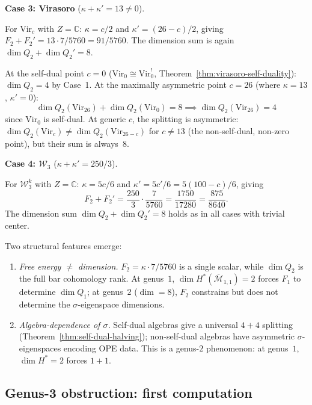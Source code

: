 \begin{computation}
\smallskip
\noindent\textbf{Case 3: Virasoro} ($\kappa + \kappa' = 13 \neq 0$).

For $\mathrm{Vir}_c$ with $Z = \mathbb{C}$:
$\kappa = c/2$ and $\kappa' = (26-c)/2$, giving
$F_2 + F_2' = 13 \cdot 7/5760 = 91/5760$.
The dimension sum is again $\dim Q_2 + \dim Q_2' = 8$.

At the self-dual point $c = 0$ ($\mathrm{Vir}_0 \cong
\mathrm{Vir}_0^!$, Theorem~\ref{thm:virasoro-self-duality}):
$\dim Q_2 = 4$ by Case~1.  At the maximally asymmetric point
$c = 26$ (where $\kappa = 13$, $\kappa' = 0$):
\[
\dim Q_2(\mathrm{Vir}_{26}) + \dim Q_2(\mathrm{Vir}_0) = 8
\implies \dim Q_2(\mathrm{Vir}_{26}) = 4
\]
since $\mathrm{Vir}_0$ is self-dual.
At generic $c$, the splitting is asymmetric:
$\dim Q_2(\mathrm{Vir}_c) \neq \dim Q_2(\mathrm{Vir}_{26-c})$
for $c \neq 13$ (the non-self-dual, non-zero point), but
their sum is always~$8$.

\smallskip
\noindent\textbf{Case 4: $\mathcal{W}_3$}
($\kappa + \kappa' = 250/3$).

For $\mathcal{W}_3^k$ with $Z = \mathbb{C}$:
$\kappa = 5c/6$ and $\kappa' = 5c'/6 = 5(100-c)/6$, giving
\[
F_2 + F_2' = \frac{250}{3} \cdot \frac{7}{5760}
= \frac{1750}{17280} = \frac{875}{8640}.
\]
The dimension sum $\dim Q_2 + \dim Q_2' = 8$ holds as in all
cases with trivial center.
\end{computation}

\begin{remark}%
\label{rem:genus2-complementarity-reveals}
Two structural features emerge:
\begin{enumerate}
\item \emph{Free energy $\neq$ dimension.}  $F_2 = \kappa \cdot 7/5760$ is a single scalar, while $\dim Q_2$ is the full bar cohomology rank.  At genus~$1$, $\dim H^*(\overline{\mathcal{M}}_{1,1}) = 2$ forces $F_1$ to determine $\dim Q_1$; at genus~$2$ ($\dim = 8$), $F_2$ constrains but does not determine the $\sigma$-eigenspace dimensions.
\item \emph{Algebra-dependence of $\sigma$.}  Self-dual algebras give a universal $4+4$ splitting (Theorem~\ref{thm:self-dual-halving}); non-self-dual algebras have asymmetric $\sigma$-eigenspaces encoding OPE data.  This is a genus-$2$ phenomenon: at genus~$1$, $\dim H^* = 2$ forces $1+1$.
\end{enumerate}
\end{remark}

\subsection{Genus-3 obstruction: first computation}\label{subsec:genus-3}


